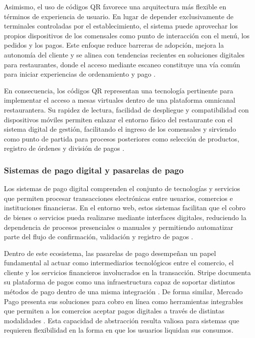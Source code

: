 \documentclass[12pt]{report}
\begin{document}
Asimismo, el uso de códigos QR favorece una arquitectura más flexible en términos de experiencia de usuario. En lugar de depender exclusivamente de terminales controladas por el establecimiento, el sistema puede aprovechar los propios dispositivos de los comensales como punto de interacción con el menú, los pedidos y los pagos. Este enfoque reduce barreras de adopción, mejora la autonomía del cliente y se alinea con tendencias recientes en soluciones digitales para restaurantes, donde el acceso mediante escaneo constituye una vía común para iniciar experiencias de ordenamiento y pago \cite{toast_vs_square_qr_2025,square_spring_food_beverage_2025}.

En consecuencia, los códigos QR representan una tecnología pertinente para implementar el acceso a mesas virtuales dentro de una plataforma omnicanal restaurantera. Su rapidez de lectura, facilidad de despliegue y compatibilidad con dispositivos móviles permiten enlazar el entorno físico del restaurante con el sistema digital de gestión, facilitando el ingreso de los comensales y sirviendo como punto de partida para procesos posteriores como selección de productos, registro de órdenes y división de pagos \cite{denso_qr_standard_2026,toast_contactless_dining_2025,toast_ordering_technology_2025}.

\subsubsection{Sistemas de pago digital y pasarelas de pago}

Los sistemas de pago digital comprenden el conjunto de tecnologías y servicios que permiten procesar transacciones electrónicas entre usuarios, comercios e instituciones financieras. En el entorno web, estos sistemas facilitan que el cobro de bienes o servicios pueda realizarse mediante interfaces digitales, reduciendo la dependencia de procesos presenciales o manuales y permitiendo automatizar parte del flujo de confirmación, validación y registro de pagos \cite{stripe_payments_docs_2026,mercadopago_docs_2026}.

Dentro de este ecosistema, las pasarelas de pago desempeñan un papel fundamental al actuar como intermediarios tecnológicos entre el comercio, el cliente y los servicios financieros involucrados en la transacción. Stripe documenta su plataforma de pagos como una infraestructura capaz de soportar distintos métodos de pago dentro de una misma integración \cite{stripe_payments_docs_2026}. De forma similar, Mercado Pago presenta sus soluciones para cobro en línea como herramientas integrables que permiten a los comercios aceptar pagos digitales a través de distintas modalidades \cite{mercadopago_docs_2026}. Esta capacidad de abstracción resulta valiosa para sistemas que requieren flexibilidad en la forma en que los usuarios liquidan sus consumos.
\end{document}
